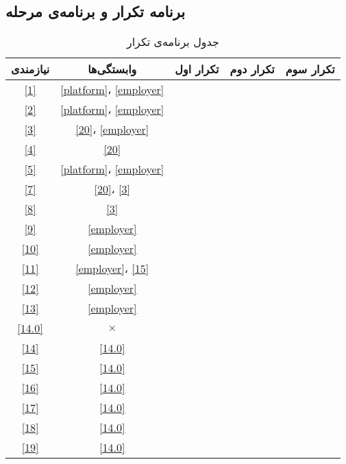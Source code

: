 \documentclass[12pt,svgnames,oneside]{book}
\begin{document}
			\subsection{برنامه تکرار و برنامه‌ی مرحله}
				\begin{center}
					\begin{longtable}{|c|c|c|c|c|}
						\caption{جدول برنامه‌ی تکرار}
						\endfirsthead
						\endhead
						\hline
						نیازمندی & وابستگی‌ها & تکرار اول & تکرار دوم & تکرار سوم \\
						\hline
						\hline
						\ref{1} & \ref{platform}، \ref{employer} & & & \\ \hline
						\ref{2} & \ref{platform}، \ref{employer} & \checkmark & & \\ \hline
						\ref{3} & \ref{20}، \ref{employer} & \checkmark & & \\ \hline
						\ref{4} & \ref{20} & \checkmark & & \\ \hline
						\ref{5} & \ref{platform}، \ref{employer} & \checkmark & & \\ \hline
						\ref{7} & \ref{20}، \ref{3} & & & \\ \hline
						\ref{8} & \ref{3} & \checkmark & & \\ \hline
						\ref{9} & \ref{employer} & \checkmark & & \\ \hline
						\ref{10} & \ref{employer} & \checkmark & & \\ \hline
						\ref{11} & \ref{employer}، \ref{15} & \checkmark & & \\ \hline
						\ref{12} & \ref{employer} & & & \\ \hline
						\ref{13} & \ref{employer} & \checkmark & & \\ \hline

						\ref{14.0} & $\times$ & \checkmark & & \\ \hline
						\ref{14} & \ref{14.0} & \checkmark & & \\ \hline
						\ref{15} & \ref{14.0} & \checkmark & & \\ \hline
						\ref{16} & \ref{14.0} & \checkmark & & \\ \hline
						\ref{17} & \ref{14.0} & \checkmark & & \\ \hline
						\ref{18} & \ref{14.0} & \checkmark & & \\ \hline
						\ref{19} & \ref{14.0} & \checkmark & & \\ \hline


\end{longtable}
\end{center}
\end{document}
